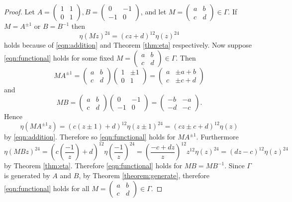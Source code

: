 \documentclass{article}
\begin{document}
\begin{proof}
Let $A=\begin{pmatrix}1&1\\0&1\end{pmatrix}, B=\begin{pmatrix}0&-1\\-1&0\end{pmatrix}$, and let $M=\begin{pmatrix}a&b\\c&d\end{pmatrix} \in \Gamma$. If $M=A^{\pm 1}$ or $B=B^{-1}$ then
\begin{equation}
\label{eqn:functional}
\eta(Mz)^{24}=(cz+d)^{12}\eta(z)^{24}
\end{equation}
holds because of \eqref{eqn:addition} and Theorem \ref{thm:eta} respectively. Now suppose \eqref{eqn:functional} holds
for some fixed $M=\begin{pmatrix}a&b\\c&d\end{pmatrix} \in \Gamma$. Then
\[
MA^{\pm 1}=\begin{pmatrix}a&b\\c&d\end{pmatrix}\begin{pmatrix}1&\pm 1\\0&1\end{pmatrix}=\begin{pmatrix}a&\pm a+b\\c&\pm c+d\end{pmatrix}
\]
and
\[
MB=\begin{pmatrix}a&b\\c&d\end{pmatrix}\begin{pmatrix}0&-1\\-1&0\end{pmatrix}=\begin{pmatrix}-b&-a\\-d&-c\end{pmatrix}.
\]
Hence
\[
\eta(MA^{\pm 1}z)=(c(z \pm 1)+d)^{12} \eta(z \pm 1)^{24}=(cz \pm c+d)^{12} \eta(z)
\]
by \eqref{eqn:addition}. Therefore so \eqref{eqn:functional} holds for $MA^{\pm 1}$. Furthermore
\[
\eta(MBz)^{24}=(c(\frac{-1}{z})+d)^{12} \eta(\frac{-1}{z})^{24}=(\frac{-c+dz}{z})^{12} z^{12} \eta(z)^{24}=(dz-c)^{12} \eta(z)^{24}
\]
by Theorem \ref{thm:eta}. Therefore \eqref{eqn:functional} holds for $MB=MB^{-1}$. Since $\Gamma$ is generated by $A$ and $B$, by Theorem \ref{theorem:generate}, therefore \eqref{eqn:functional} holds for all $M=\begin{pmatrix}a&b\\c&d\end{pmatrix} \in \Gamma$.


\end{proof}
\end{document}

